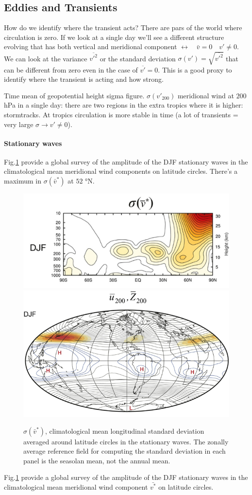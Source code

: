 \subsection{Eddies and Transients}

How do we identify where the transient acts? There are pars of the world where circulation is zero. If we look at a single day we'll see a different structure evolving that has both vertical and meridional component $\leftrightarrow \quad \bar{v}=0 \quad v'\neq 0$. We can look at the variance $\overline{v'^2}$ or the standard deviation $\sigma (v')=\sqrt{\overline{v'^2}}$ that can be different from zero even in the case of $\overline{v'}=0$. This is a good proxy to identify where the transient is acting and how strong. 

Time mean of geopotential height sigma figure. $\sigma (v'_{200})$ meridional wind at $200$ hPa in a single day: there are two regions in the extra tropics where it is higher: stormtracks. At tropics circulation is more stable in time (a lot of transients = very large $\sigma\rightarrow v'\neq 0$). 
\paragraph{Stationary waves}
Fig.\ref{fig:sigma vmean} provide a global survey of the amplitude of the DJF stationary waves in the climatological mean meridional wind components on latitude circles. There's a maximum in $\sigma(\bar{v}^*)$ at $52$ °N. 
\begin{figure}
    \centering
    \includegraphics[width=0.5\linewidth]{uploads/sigma vmean.png}\includegraphics[width=0.5\linewidth]{uploads/sigma vmean world.png}
    \caption{$\sigma(\bar{v}^*)$, climatological mean longitudinal standard deviation averaged around latitude circles in the stationary waves. The zonally average reference field for computing the standard deviation in each panel is the seasolan mean, not the annual mean.}
    \label{fig:sigma vmean}
\end{figure}
Fig.\ref{fig:sigma vmean} provide a global survey of the amplitude of the DJF stationary waves in the climatological mean meridional wind component $\bar{v^*}$ on latitude circles. 

